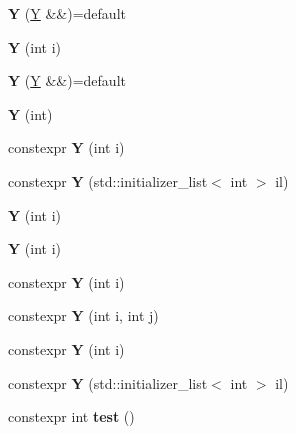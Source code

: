 \begin{DoxyCompactItemize}
\mbox{\label{struct_y_ad22c5d0f377486589a7fd2bdbd347ca2}} 
{\bfseries Y} (\mbox{\hyperlink{struct_y}{Y}} \&\&)=default
\item 
\mbox{\label{struct_y_af1588259bfcb402645136c0b58e2f133}} 
{\bfseries Y} (int i)
\item 
\mbox{\label{struct_y_ad22c5d0f377486589a7fd2bdbd347ca2}} 
{\bfseries Y} (\mbox{\hyperlink{struct_y}{Y}} \&\&)=default
\item 
\mbox{\label{struct_y_af9cbd6e1ea08f25e7207ebf44fcb5c4a}} 
{\bfseries Y} (int)
\item 
\mbox{\label{struct_y_a2e9959d9603081746897b7a2f6904f93}} 
constexpr {\bfseries Y} (int i)
\item 
\mbox{\label{struct_y_a407a014e87f62dd251ba1f4eeed90b7b}} 
constexpr {\bfseries Y} (std\+::initializer\+\_\+list$<$ int $>$ il)
\item 
\mbox{\label{struct_y_af1588259bfcb402645136c0b58e2f133}} 
{\bfseries Y} (int i)
\item 
\mbox{\label{struct_y_af1588259bfcb402645136c0b58e2f133}} 
{\bfseries Y} (int i)
\item 
\mbox{\label{struct_y_a2e9959d9603081746897b7a2f6904f93}} 
constexpr {\bfseries Y} (int i)
\item 
\mbox{\label{struct_y_a99fe2a6a01f13f53227da46f162f20ee}} 
constexpr {\bfseries Y} (int i, int j)
\item 
\mbox{\label{struct_y_a2e9959d9603081746897b7a2f6904f93}} 
constexpr {\bfseries Y} (int i)
\item 
\mbox{\label{struct_y_a407a014e87f62dd251ba1f4eeed90b7b}} 
constexpr {\bfseries Y} (std\+::initializer\+\_\+list$<$ int $>$ il)
\item 
\mbox{\label{struct_y_a2990debfc44f732d9321677206a12894}} 
constexpr int {\bfseries test} ()
\item 

\end{DoxyCompactItemize}

